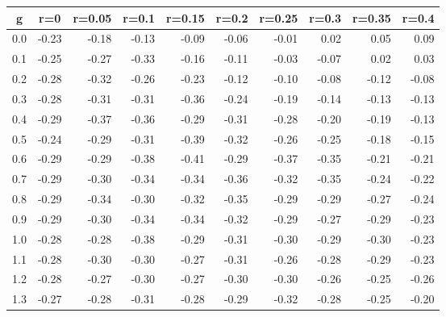 %
\begin{table}[!tbp]
 \begin{center}
 \begin{tabular}{rrrrrrrrrr}\hline\hline
\multicolumn{1}{c}{g}&\multicolumn{1}{c}{r=0}&\multicolumn{1}{c}{r=0.05}&\multicolumn{1}{c}{r=0.1}&\multicolumn{1}{c}{r=0.15}&\multicolumn{1}{c}{r=0.2}&\multicolumn{1}{c}{r=0.25}&\multicolumn{1}{c}{r=0.3}&\multicolumn{1}{c}{r=0.35}&\multicolumn{1}{c}{r=0.4}\tabularnewline
\hline
0.0&-0.23&-0.18&-0.13&-0.09&-0.06&-0.01& 0.02& 0.05& 0.09\tabularnewline
0.1&-0.25&-0.27&-0.33&-0.16&-0.11&-0.03&-0.07& 0.02& 0.03\tabularnewline
0.2&-0.28&-0.32&-0.26&-0.23&-0.12&-0.10&-0.08&-0.12&-0.08\tabularnewline
0.3&-0.28&-0.31&-0.31&-0.36&-0.24&-0.19&-0.14&-0.13&-0.13\tabularnewline
0.4&-0.29&-0.37&-0.36&-0.29&-0.31&-0.28&-0.20&-0.19&-0.13\tabularnewline
0.5&-0.24&-0.29&-0.31&-0.39&-0.32&-0.26&-0.25&-0.18&-0.15\tabularnewline
0.6&-0.29&-0.29&-0.38&-0.41&-0.29&-0.37&-0.35&-0.21&-0.21\tabularnewline
0.7&-0.29&-0.30&-0.34&-0.34&-0.36&-0.32&-0.35&-0.24&-0.22\tabularnewline
0.8&-0.29&-0.34&-0.30&-0.32&-0.35&-0.29&-0.29&-0.27&-0.24\tabularnewline
0.9&-0.29&-0.30&-0.34&-0.34&-0.32&-0.29&-0.27&-0.29&-0.23\tabularnewline
1.0&-0.28&-0.28&-0.38&-0.29&-0.31&-0.30&-0.29&-0.30&-0.23\tabularnewline
1.1&-0.28&-0.30&-0.30&-0.27&-0.31&-0.26&-0.28&-0.29&-0.23\tabularnewline
1.2&-0.28&-0.27&-0.30&-0.27&-0.30&-0.30&-0.26&-0.25&-0.26\tabularnewline
1.3&-0.27&-0.28&-0.31&-0.28&-0.29&-0.32&-0.28&-0.25&-0.20\tabularnewline
\hline
\end{tabular}

\end{center}

\end{table}

